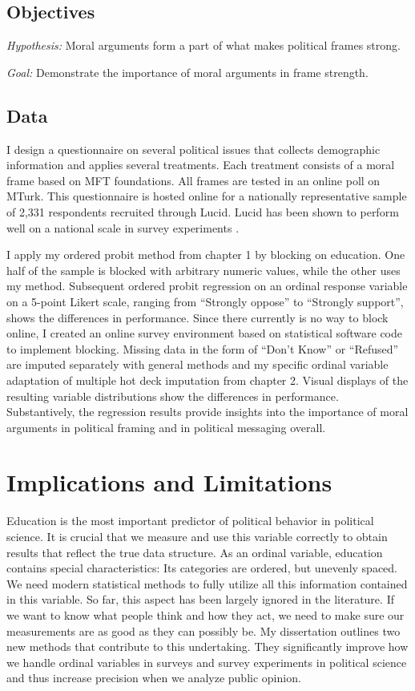 \documentclass[11pt]{article}
\begin{document}
\subsection{Objectives}

\textit{Hypothesis:} Moral arguments form a part of what makes political frames strong.\par
\noindent \textit{Goal:} Demonstrate the importance of moral arguments in frame strength.


\subsection{Data}

I design a questionnaire on several political issues that collects demographic information and applies several treatments. Each treatment consists of a moral frame based on MFT foundations. All frames are tested in an online poll on MTurk. This questionnaire is hosted online for a nationally representative sample of 2,331 respondents recruited through Lucid. Lucid  has been shown to perform well on a national scale in survey experiments \citep{coppock_2019_validating}. 

I apply my ordered probit method from chapter 1 by blocking on education. One half of the sample is blocked with arbitrary numeric values, while the other uses my method. Subsequent ordered probit regression on an ordinal response variable on a 5-point Likert scale, ranging from ``Strongly oppose'' to ``Strongly support'', shows the differences in performance. Since there currently is no way to block online, I created an online survey environment based on statistical software code to implement blocking. Missing data in the form of ``Don't Know'' or ``Refused'' are imputed separately with general methods and my specific ordinal variable adaptation of multiple hot deck imputation from chapter 2. Visual displays of the resulting variable distributions show the differences in performance. Substantively, the regression results provide insights into the importance of moral arguments in political framing and in political messaging overall. 

\section*{Implications and Limitations}

Education is the most important predictor of political behavior in political science. It is crucial that we measure and use this variable correctly to obtain results that reflect the true data structure. As an ordinal variable, education contains special characteristics: Its categories are ordered, but unevenly spaced. We need modern statistical methods to fully utilize all this information contained in this variable. So far, this aspect has been largely ignored in the literature. If we want to know what people think and how they act, we need to make sure our measurements are as good as they can possibly be. My dissertation outlines two new methods that contribute to this undertaking. They significantly improve how we handle ordinal variables in surveys and survey experiments in political science and thus increase precision when we analyze public opinion.
\end{document}
